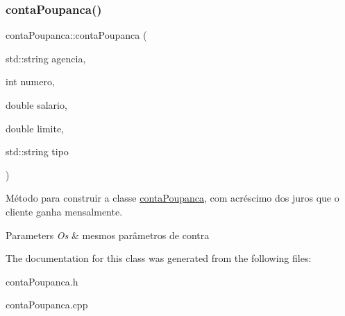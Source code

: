 \subsubsection{\texorpdfstring{conta\+Poupanca()}{contaPoupanca()}}
{\footnotesize\ttfamily conta\+Poupanca\+::conta\+Poupanca (\begin{DoxyParamCaption}\item[{std\+::string}]{agencia,  }\item[{int}]{numero,  }\item[{double}]{salario,  }\item[{double}]{limite,  }\item[{std\+::string}]{tipo }\end{DoxyParamCaption})}



Método para construir a classe \mbox{\hyperlink{classcontaPoupanca}{conta\+Poupanca}}, com acréscimo dos juros que o cliente ganha mensalmente. 


\begin{DoxyParams}{Parameters}
{\em Os} & mesmos parâmetros de contra \\
\hline
\end{DoxyParams}


The documentation for this class was generated from the following files\+:\begin{DoxyCompactItemize}
\item 
conta\+Poupanca.\+h\item 
conta\+Poupanca.\+cpp\end{DoxyCompactItemize}
